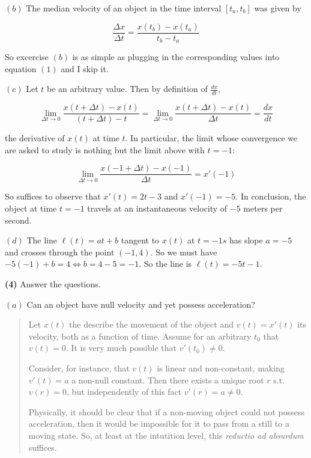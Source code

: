 \documentclass[12pt]{article}
\theoremstyle{definition}
\begin{document}
$(b)$ The median velocity of an object in the time interval $[t_a, t_b]$  was
given by 

\begin{equation}
    \frac{\Delta x}{\Delta t} = \frac{ x(t_b) - x(t_a) }{t_b - t_a}
\end{equation}

So excercise $(b)$ is as simple as plugging in the corresponding values into
equation $(1)$ and I skip  it. 

$(c)$ Let $t$ be an arbitrary value. Then by definition of $\frac{dx}{dt}$,

\begin{equation*}
    \lim_{\Delta t \to 0 } \frac{x(t + \Delta t) - x(t)}{(t + \Delta t) -
    t} =\lim_{\Delta t \to 0 } \frac{ x(t + \Delta t) - x(t) }{\Delta t} = \frac{dx}{dt}
\end{equation*}

the derivative of $x(t)$ at time $t$. In particular, the limit whose convergence
we are asked to study is nothing but the limit above with $t = -1$:

\begin{equation*}
    \lim_{\Delta t \to 0 } \frac{x(-1 + \Delta t) - x(-1)}{\Delta t} = x'(-1)
\end{equation*}

So suffices to observe that $x'(t) = 2t - 3$ and $x'(-1) = -5$. In conclusion, 
the object at time $t = -1$ travels at an instantaneous velocity of $-5$ meters
per second.

$(d)$ The line $\ell(t) = at + b$ tangent to $x(t)$ at $t = -1s$ has slope $a =
-5$ and crosses through the point $(-1, 4)$. So we must have $-5(-1) + b = 4
\iff b = 4 - 5 = -1$. So the line is $\ell(t) = -5t - 1$.

\pagebreak 

\begin{shaded}
    \textbf{(4)} Answer the questions.
\end{shaded}

$(a)$ Can an object have null velocity and yet possess acceleration?  


\small
\begin{quote}

Let $x(t)$ the describe the movement of the object and $v(t) = x'(t)$ its
velocity, both as a function of time. Assume for an arbitrary $t_0$ that 
$v(t) = 0$. It is very much possible that $v'(t_0) \neq 0$.  

Consider, for instance, that $v(t)$ is linear and non-constant, making $v'(t) =
a$ a non-null constant. Then there exists a unique root $r$ s.t. $v(r) = 0$, but
independently of this fact $v'(r) = a \neq 0$.

Physically, it should be clear that if a non-moving object could not possess
acceleration, then it would be impossible for it to pass from a still to a
moving state. So, at least at the intutition level, this \textit{reductio ad
absurdum} suffices.

\end{quote}
\normalsize
\end{document}
